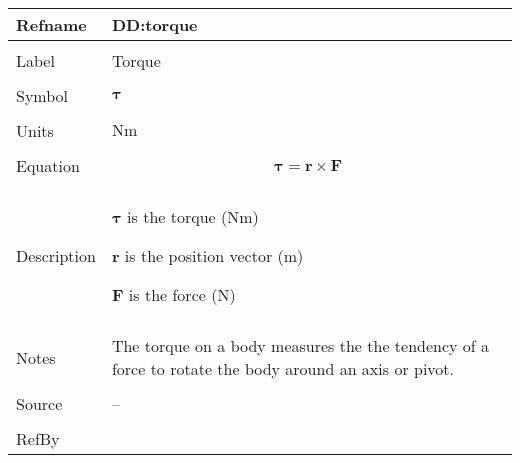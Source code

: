 \documentclass[12pt]{article}
\begin{document}
\vspace{\baselineskip}
\noindent
\begin{minipage}{\textwidth}
\begin{tabular}{>{\raggedright}p{}>{\raggedright\arraybackslash}p{}}
\toprule \textbf{Refname} & \textbf{DD:torque}
\label{DD:torque}
\\ \midrule \\
Label & Torque
        
\\ \midrule \\
Symbol & $\mathbf{τ}$
         
\\ \midrule \\
Units & $\text{N}\text{m}$
        
\\ \midrule \\
Equation & \begin{displaymath}
           \mathbf{τ}=\mathbf{r}\times\mathbf{F}
           \end{displaymath}
\\ \midrule \\
Description & \begin{symbDescription}
              \item{$\mathbf{τ}$ is the torque ($\text{N}\text{m}$)}
              \item{$\mathbf{r}$ is the position vector (${\text{m}}$)}
              \item{$\mathbf{F}$ is the force (${\text{N}}$)}
              \end{symbDescription}
\\ \midrule \\
Notes & The torque on a body measures the the tendency of a force to rotate the body around an axis or pivot.
        
\\ \midrule \\
Source & --
         
\\ \midrule \\
RefBy & 
\\ \bottomrule
\end{tabular}
\end{minipage}
\end{document}

